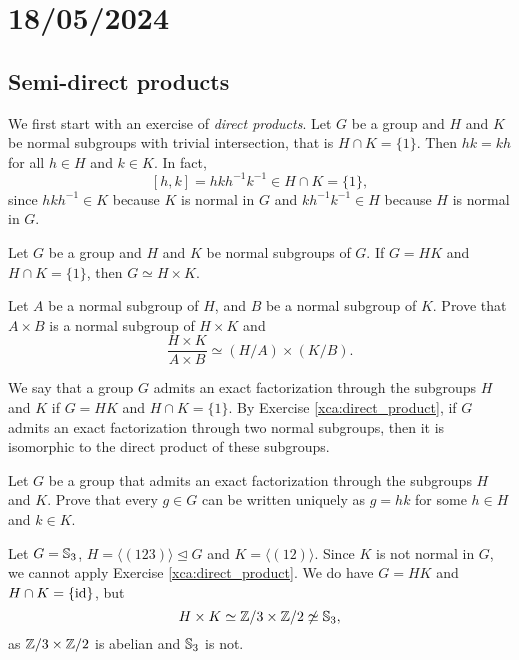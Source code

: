 \section{18/05/2024}

\subsection{Semi-direct products}

We first start with an exercise of \emph{direct products}. Let $G$ be a group and $H$ and $K$ be normal subgroups with trivial intersection, that is $H\cap K=\{1\}$. 
Then $hk=kh$ for all $h\in H$ and $k\in K$. In fact, 
\[
[h,k]=hkh^{-1}k^{-1}\in H\cap K=\{1\}, 
\]
since $hkh^{-1}\in K$ because $K$ is normal in $G$ and 
$kh^{-1}k^{-1}\in H$ because $H$ is normal in $G$. 

\begin{exercise}
\label{xca:direct_product}
Let $G$ be a group and $H$ and $K$ be normal subgroups of $G$.
If $G=HK$ and $H\cap K=\{1\}$, then $G\simeq H\times K$.
\end{exercise}

\begin{exercise}
\label{xca:direct_product:quotient}
Let $A$ be a normal subgroup of $H$, and $B$ be a normal subgroup of $K$. 
Prove that $A\times B$ is a normal subgroup of
$H\times K$ and 
\[
\frac{H\times K}{A\times B}\simeq(H/A)\times(K/B).
\]
\end{exercise}

We say that a group $G$ admits an exact factorization through 
the subgroups $H$ and $K$ if $G=HK$ and 
$H\cap K=\{1\}$. By Exercise \ref{xca:direct_product}, 
if $G$ admits an exact factorization through two normal subgroups, then 
it is isomorphic to the direct product of these subgroups. 

\begin{exercise}
\label{xca:uniqueness}
    Let $G$ be a group that admits an exact factorization through
    the subgroups $H$ and $K$. Prove that every $g\in G$ can be written 
    uniquely as $g=hk$ for some $h\in H$ and $k\in K$. 
\end{exercise}

\begin{example}
Let $G=\mathbb{S}_3$, $H=\langle (123)\rangle\unlhd G$ and $K=\langle (12)\rangle$. Since
$K$ is not normal in $G$, we cannot apply Exercise \ref{xca:direct_product}. 
We do have $G=HK$ and $H\cap K=\{\operatorname{id}\}$, but 
\[
H\times K\simeq\mathbb{Z}/3\times\mathbb{Z}/2\not\simeq\mathbb{S}_3,
\]
as $\mathbb{Z}/3\times\mathbb{Z}/2$ is abelian and $\mathbb{S}_3$ is not. 
\end{example}

